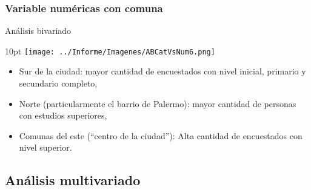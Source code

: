 \documentclass[pdf]{beamer}
\def\vspace{}%
\begin{document}
{    \subsubsection{Variable numéricas con comuna}
\begin{frame}{Análisis bivariado}
    \begin{minipage}{0.55\textwidth}
        \vspace{10pt}
        \texttt{[image: ../Informe/Imagenes/ABCatVsNum6.png]}
    \end{minipage}
    \begin{minipage}{0.4\textwidth}
        \begin{itemize}
            \vspace{4pt}
            \justifying%
            \item Sur de la ciudad: mayor cantidad de encuestados con nivel inicial, primario y secundario completo,
            \item Norte (particularmente el barrio de Palermo): mayor cantidad de personas con estudios superiores,
            \item Comunas del este (``centro de la ciudad''): Alta cantidad de encuestados con nivel superior.
        \end{itemize}
    \end{minipage}

\end{frame}    

    \subsection{Análisis multivariado}

}
\end{document}
